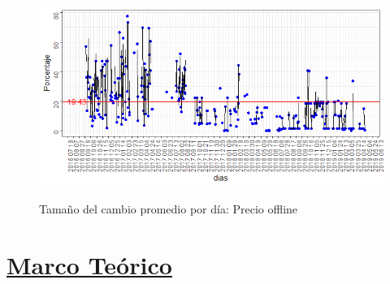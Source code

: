 \documentclass[12pt,a4paper,pdflatex]{article}
\begin{document}
\begin{figure}[!ht]
\centering
 \caption{Tamaño del cambio promedio por d\'ia: Precio offline}
\includegraphics[scale=1.0]{tamano_cambio_promedio_normal.png}
  \label{fig:Tamaño del cambio promedio por d\'ia: Precio offline}
\end{figure}


\clearpage

\section{\underline{Marco Teórico}}\label{sec3}
\end{document}
